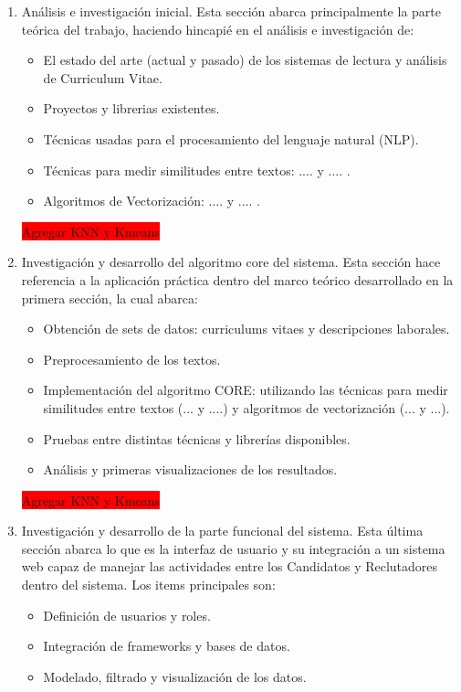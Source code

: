 \documentclass[12pt,a4paper]{article}
\begin{document}
\begin{enumerate}

\item Análisis e investigación inicial. Esta sección abarca principalmente la parte teórica del trabajo, haciendo hincapié en el análisis e investigación de:
\begin{itemize}
	\item El estado del arte (actual y pasado) de los sistemas de lectura y análisis de Curriculum Vitae.
	\item Proyectos y librerias existentes.
	\item Técnicas usadas para el procesamiento del lenguaje natural (NLP).
	\item Técnicas para medir similitudes entre textos:  .... y .... .
	\item Algoritmos de Vectorización: .... y .... .
\end{itemize} 

\colorbox{red}{Agregar KNN y Kmeans}\\

\item Investigación y desarrollo del algoritmo core del sistema. Esta sección hace referencia a la aplicación práctica dentro del marco teórico desarrollado en la primera sección, la cual abarca:
\begin{itemize}
	\item Obtención de sets de datos: curriculums vitaes y descripciones laborales. 
	\item Preprocesamiento de los textos.
	\item Implementación del algoritmo CORE: utilizando las técnicas para medir similitudes entre textos (... y ....) y algoritmos de vectorización (... y ...).
	\item Pruebas entre distintas técnicas y librerías disponibles. 
	\item Análisis y primeras visualizaciones de los resultados.
\end{itemize} 

\colorbox{red}{Agregar KNN y Kmeans}\\
	
\item Investigación y desarrollo de la parte funcional del sistema. Esta última sección abarca lo que es la interfaz de usuario y su integración a un sistema web capaz de manejar las actividades entre los Candidatos y Reclutadores dentro del sistema. Los items principales son:
\begin{itemize}
	\item Definición de usuarios y roles.
	\item Integración de frameworks y bases de datos.  
	\item Modelado, filtrado y visualización de los datos.
\end{itemize} 

\end{enumerate}
\end{document}

